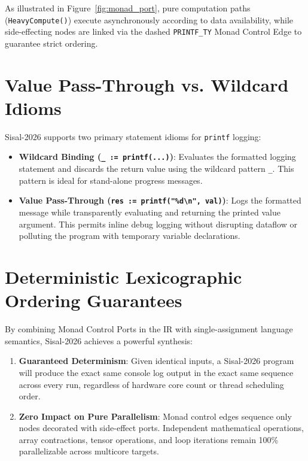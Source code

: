 As illustrated in Figure~\ref{fig:monad_port}, pure computation paths (\texttt{HeavyCompute()}) execute asynchronously according to data availability, while side-effecting nodes are linked via the dashed \texttt{PRINTF\_TY} Monad Control Edge to guarantee strict ordering.

\section{Value Pass-Through vs. Wildcard Idioms}
Sisal-2026 supports two primary statement idioms for \texttt{printf} logging:
\begin{itemize}
    \item \textbf{Wildcard Binding (\texttt{\_ := printf(...)})}: Evaluates the formatted logging statement and discards the return value using the wildcard pattern \texttt{\_}. This pattern is ideal for stand-alone progress messages.
    \item \textbf{Value Pass-Through (\texttt{res := printf("\%d\textbackslash n", val)})}: Logs the formatted message while transparently evaluating and returning the printed value argument. This permits inline debug logging without disrupting dataflow or polluting the program with temporary variable declarations.
\end{itemize}

\section{Deterministic Lexicographic Ordering Guarantees}
By combining Monad Control Ports in the IR with single-assignment language semantics, Sisal-2026 achieves a powerful synthesis:
\begin{enumerate}
    \item \textbf{Guaranteed Determinism}: Given identical inputs, a Sisal-2026 program will produce the exact same console log output in the exact same sequence across every run, regardless of hardware core count or thread scheduling order.
    \item \textbf{Zero Impact on Pure Parallelism}: Monad control edges sequence only nodes decorated with side-effect ports. Independent mathematical operations, array contractions, tensor operations, and loop iterations remain 100\% parallelizable across multicore targets.
\end{enumerate}
